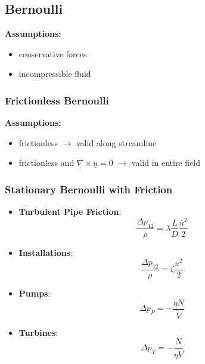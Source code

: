 \subsection{Bernoulli}
    \textbf{Assumptions:}
    \begin{itemize}
        \item conservative forces
        \item incompressible fluid
    \end{itemize}
    \subsubsection{Frictionless Bernoulli}
        \textbf{Assumptions:}
        \begin{itemize}
            \item frictionless $\rightarrow$ valid along streamline
            \item frictionless and $\underline{\nabla} \times \underline{u} = 0$ $\rightarrow$ valid in entire field
        \end{itemize}
    \subsubsection{Stationary Bernoulli with Friction}
        \begin{itemize}
            \item \textbf{Turbulent Pipe Friction}: 
            $$ \frac{\Delta p_{12}}{\rho} = \lambda \frac{L}{D} \frac{\overline{u}^2}{2} $$
            \item \textbf{Installations}:
            $$  \frac{\Delta p_{12}}{\rho} = \zeta \frac{\overline{u}^2}{2}$$
            \item \textbf{Pumps}:
            $$ \Delta p_P = - \frac{\eta N}{\dot{V}} $$
            \item \textbf{Turbines}:
            $$ \Delta p_T = - \frac{N}{\eta \dot{V}} $$
        \end{itemize}